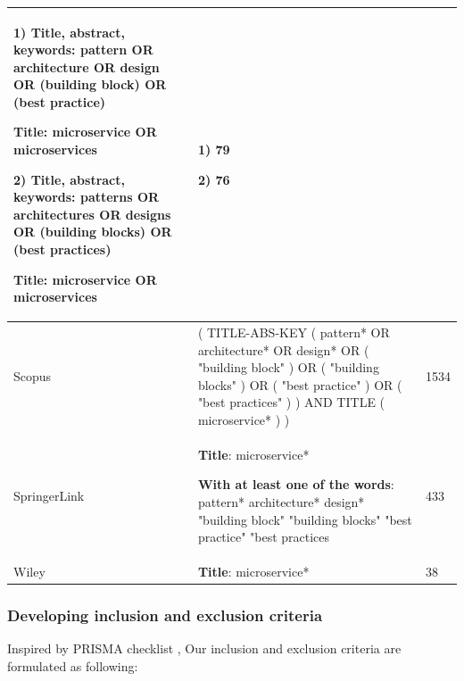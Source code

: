 \documentclass{bmcart}
\begin{document}
\begin{table}
\begin{tabular}{|p{3cm}|p{7cm}|p{1.5cm}|}
        1) \textbf{Title, abstract, keywords}: pattern OR architecture OR design OR (building block) OR (best practice)

           \textbf{Title}: microservice OR microservices

        2) \textbf{Title, abstract, keywords}: patterns OR architectures OR designs OR (building blocks) OR (best practices)

            \textbf{Title}: microservice OR microservices
        & 
        1) 79

        2) 76
        \\ 

        \hline

        Scopus & ( TITLE-ABS-KEY ( pattern*  OR  architecture*  OR  design*  OR  ( "building block" )  OR  ( "building blocks" )  OR  ( "best practice" )  OR  ( "best practices" ) )  AND  TITLE ( microservice* ) ) & 1534 \\ 
        \hline

        SpringerLink & \textbf{Title}: microservice*


        \textbf{With at least one of the words}: pattern* architecture* design* "building block" "building blocks" "best practice" "best practices
         & 433 \\ 
        \hline

        Wiley & \textbf{Title}: microservice* & 38 \\ 

        \hline
    \end{tabular}
    
    \label{searchTerms}
\end{table}


\subsubsection{Developing inclusion and exclusion criteria} \label{incexc}

Inspired by PRISMA checklist \cite{tricco2018prisma}, Our inclusion and exclusion criteria are formulated as following:
\end{document}
